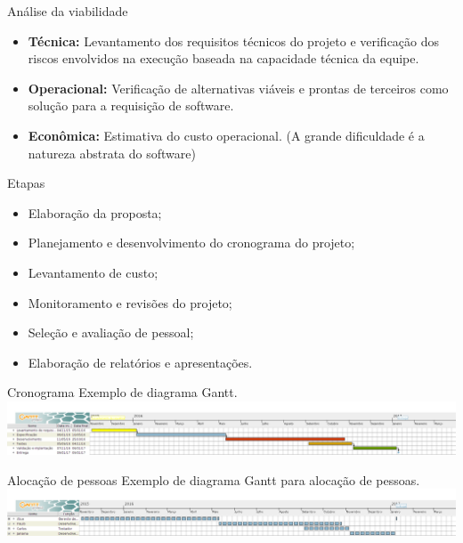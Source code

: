 
\frame{\maketitle}

\begin{frame}{Análise da viabilidade}
  \begin{itemize}[<+-| alert@+>]
  \item {\bf Técnica:} Levantamento dos requisitos técnicos do projeto e
    verificação dos riscos envolvidos na execução baseada na
    capacidade técnica da equipe.
  \item {\bf Operacional:} Verificação de alternativas viáveis e prontas de
    terceiros como solução para a requisição de software.
  \item {\bf Econômica:} Estimativa do custo operacional. (A grande
    dificuldade é a natureza abstrata do software)
  \end{itemize}
\end{frame}

\begin{frame}{Etapas}
  \begin{itemize}[<+-| alert@+>]
  \item Elaboração da proposta;
  \item Planejamento e desenvolvimento do cronograma do projeto;
  \item Levantamento de custo;
  \item Monitoramento e revisões do projeto;
  \item Seleção e avaliação de pessoal;
  \item Elaboração de relatórios e apresentações.
  \end{itemize}
\end{frame}

\begin{frame}{Cronograma}
  Exemplo de diagrama Gantt.\\
  \includegraphics[scale=.19]{img/exemplo-gantt.png}
\end{frame}

\begin{frame}{Alocação de pessoas}
  Exemplo de diagrama Gantt para alocação de pessoas.\\
  \includegraphics[scale=.19]{img/exemplo-ganttp.png}
\end{frame}

